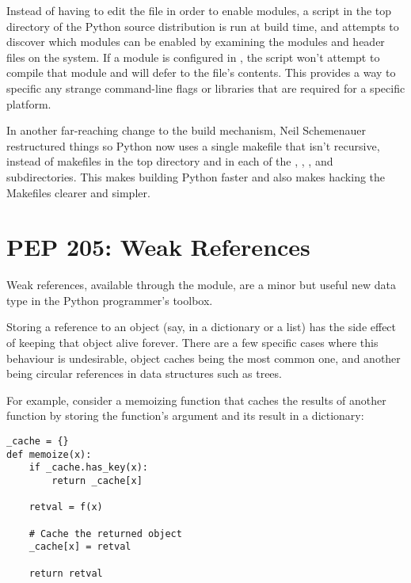 \documentclass{howto}
\begin{document}
Instead of having to edit the  file in order to
enable modules, a  script in the top directory of the
Python source distribution is run at build time, and attempts to
discover which modules can be enabled by examining the modules and
header files on the system.  If a module is configured in
, the  script won't attempt to
compile that module and will defer to the  file's
contents.  This provides a way to specific any strange command-line
flags or libraries that are required for a specific platform.

In another far-reaching change to the build mechanism, Neil
Schemenauer restructured things so Python now uses a single makefile
that isn't recursive, instead of makefiles in the top directory and in
each of the , , , and
 subdirectories.  This makes building Python faster
and also makes hacking the Makefiles clearer and simpler.

\begin{seealso} 


\end{seealso}

\section{PEP 205: Weak References}

Weak references, available through the  module, are a
minor but useful new data type in the Python programmer's toolbox.

Storing a reference to an object (say, in a dictionary or a list) has
the side effect of keeping that object alive forever.  There are a few
specific cases where this behaviour is undesirable, object caches
being the most common one, and another being circular references in
data structures such as trees.

For example, consider a memoizing function that caches the results of
another function  by storing the function's
argument and its result in a dictionary:

\begin{verbatim}
_cache = {}
def memoize(x):
    if _cache.has_key(x):
        return _cache[x]

    retval = f(x)

    # Cache the returned object
    _cache[x] = retval

    return retval
\end{verbatim}
\end{document}
